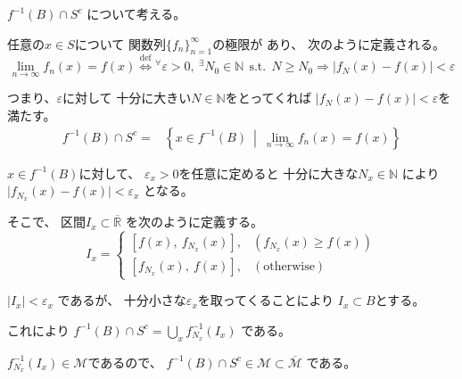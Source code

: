 \documentclass[12pt,b5paper]{ltjsarticle}
\begin{document}
\begin{enumerate}
      $f^{-1}(B)\cap S^{c}$
      について考える。


      任意の$x\in S$について
      関数列$\{f_{n}\}_{n=1}^{\infty}$の極限が
      あり、
      次のように定義される。
      \begin{equation}
       \lim_{n\to\infty}f_{n}(x) = f(x)
        \overset{\mathrm{def}}{\iff}
        {}^{\forall}\varepsilon >0,\: {}^{\exists}N_{0}\in\mathbb{N}
        \ \ \text{s.t.}\ \
        N \geq N_{0} \Rightarrow
        \lvert f_{N}(x) - f(x) \rvert <\varepsilon
      \end{equation}

      つまり、$\varepsilon$に対して
      十分に大きい$N\in\mathbb{N}$をとってくれば
      $\lvert f_{N}(x) - f(x) \rvert <\varepsilon$を満たす。
      \begin{align}
       f^{-1}(B)\cap S^{c}
        =& \left\{
           x\in f^{-1}(B) \:\middle|\: \lim_{n\to\infty}f_{n}(x) = f(x)
        \right\}
      \end{align}

      $x\in f^{-1}(B)$に対して、
      $\varepsilon_{x} >0$を任意に定めると
      十分に大きな$N_{x}\in\mathbb{N}$
      により
      $\lvert f_{N_{x}}(x) - f(x) \rvert <\varepsilon_{x}$
      となる。

      そこで、
      区間$I_{x}\subset \overline{\mathbb{R}}$
      を次のように定義する。
      \begin{equation}
       I_{x} =
        \begin{cases}
         [f(x),\ f_{N_{x}}(x)] ,& (f_{N_{x}}(x) \geq f(x))\\
         [f_{N_{x}}(x),\ f(x)] ,& ( \text{otherwise})
        \end{cases}
      \end{equation}

      $\lvert I_{x} \rvert < \varepsilon_{x}$
      であるが、
      十分小さな$\varepsilon_{x}$を取ってくることにより
      $I_{x} \subset B$とする。

      これにより
      $f^{-1}(B)\cap S^{c} = \bigcup_{x} f_{N_{x}}^{-1}(I_{x})$
      である。

      $f_{N_{x}}^{-1}(I_{x}) \in \mathcal{M}$であるので、
      $f^{-1}(B)\cap S^{c} \in \mathcal{M} \subset \overline{\mathcal{M}}$
      である。
      

\end{enumerate}
\end{document}
